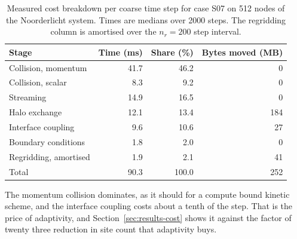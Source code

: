\begin{table}[t]
\centering
\caption[Cost breakdown for a production case]{Measured cost breakdown per
coarse time step for case S07 on 512 nodes of the Noorderlicht system. Times are
medians over 2000 steps. The regridding column is amortised over the $n_r = 200$
step interval.}
\label{tab:cost-breakdown}
\begin{tabular}{lrrr}
\toprule
Stage & Time (ms) & Share (\%) & Bytes moved (MB) \\
\midrule
Collision, momentum   & 41.7 & 46.2 & 0 \\
Collision, scalar     &  8.3 &  9.2 & 0 \\
Streaming             & 14.9 & 16.5 & 0 \\
Halo exchange         & 12.1 & 13.4 & 184 \\
Interface coupling    &  9.6 & 10.6 & 27 \\
Boundary conditions   &  1.8 &  2.0 & 0 \\
Regridding, amortised &  1.9 &  2.1 & 41 \\
\midrule
Total                 & 90.3 & 100.0 & 252 \\
\bottomrule
\end{tabular}
\end{table}

The momentum collision dominates, as it should for a compute bound kinetic
scheme, and the interface coupling costs about a tenth of the step. That is the
price of adaptivity, and Section~\ref{sec:results-cost} shows it against the
factor of twenty three reduction in site count that adaptivity buys.
